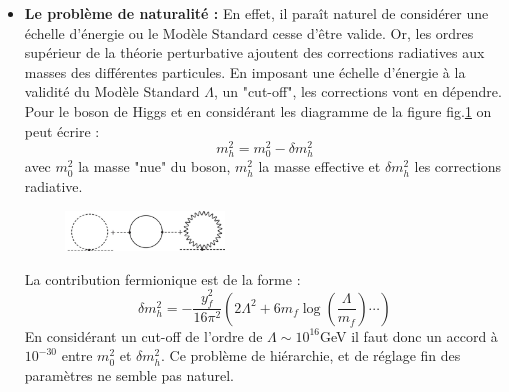 \begin{itemize}[label=$\bullet$]
\item \textbf{Le problème de naturalité :} En effet, il paraît naturel de considérer une échelle d'énergie ou le Modèle Standard cesse d'être valide. Or, les ordres supérieur de la théorie perturbative ajoutent des corrections radiatives aux masses des différentes particules. En imposant une échelle d'énergie à la validité du Modèle Standard $\Lambda$, un "cut-off", les corrections vont en dépendre. Pour le boson de Higgs et en considérant les diagramme de la figure fig.\cref{corrections} on peut écrire :
\begin{equation}
m_{h}^{2}=m_{0}^{2}-\delta m_{h}^{2}
\end{equation}
avec $m_{0}^{2}$ la masse "nue" du boson, $m_{h}^{2}$ la masse effective et $\delta m_{h}^{2}$ les corrections radiative.
\begin{figure}[h!]
\centering
\includegraphics[width=0.40\textwidth]{SM/corrections.jpg}
\label{corrections}
\end{figure}
La contribution fermionique est de la forme :
\begin{equation}
\label{eq1}
\delta m_{h}^{2}=-\frac{y_{f}^{2}}{16\pi^{2}}\left(2\Lambda^{2}+6m_{f}\log\left(\frac{\Lambda}{m_{f}}\right)\cdots\right)
\end{equation}
En considérant un cut-off de l'ordre de $\Lambda \sim 10^{16}$GeV il faut donc un accord à $10^{-30}$ entre $m_{0}^{2}$ et $\delta m_{h}^{2}$. Ce problème de hiérarchie, et de réglage fin des paramètres ne semble pas naturel.


\end{itemize}
